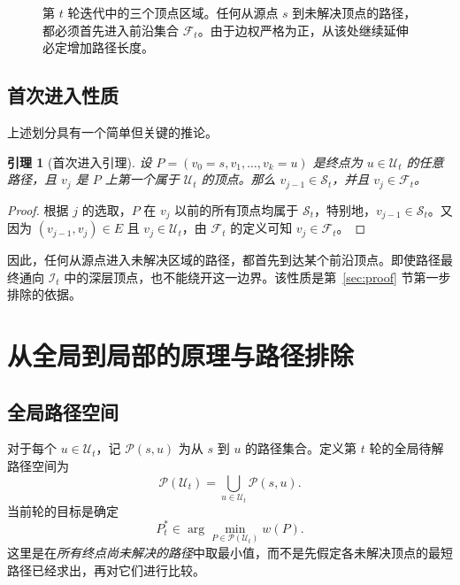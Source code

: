 \documentclass[UTF8,11pt,a4paper]{ctexart}
\newtheorem{lemma}{引理}
\newcommand{\Sset}{\mathcal S_t}
\newcommand{\Uset}{\mathcal U_t}
\newcommand{\Fset}{\mathcal F_t}
\newcommand{\Iset}{\mathcal I_t}
\newcommand{\PathU}{\mathcal P(\mathcal U_t)}
\begin{document}
\begin{figure}[htbp]
\caption{第 $t$ 轮迭代中的三个顶点区域。任何从源点 $s$ 到未解决顶点的路径，都必须首先进入前沿集合 $\mathcal{F}_t$。由于边权严格为正，从该处继续延伸必定增加路径长度。}
\label{fig:spatial}
\end{figure}

\subsection{首次进入性质}
上述划分具有一个简单但关键的推论。

\begin{lemma}[首次进入引理]\label{lem:firstentry}
设 $P=(v_0=s,v_1,\ldots,v_k=u)$ 是终点为 $u\in\Uset$ 的任意路径，且 $v_j$ 是 $P$ 上第一个属于 $\Uset$ 的顶点。那么 $v_{j-1}\in\Sset$，并且 $v_j\in\Fset$。
\end{lemma}
\begin{proof}
根据 $j$ 的选取，$P$ 在 $v_j$ 以前的所有顶点均属于 $\Sset$，特别地，$v_{j-1}\in\Sset$。又因为 $(v_{j-1},v_j)\in E$ 且 $v_j\in\Uset$，由 $\Fset$ 的定义可知 $v_j\in\Fset$。
\end{proof}

因此，任何从源点进入未解决区域的路径，都首先到达某个前沿顶点。即使路径最终通向 $\Iset$ 中的深层顶点，也不能绕开这一边界。该性质是第~\ref{sec:proof} 节第一步排除的依据。

\section{从全局到局部的原理与路径排除}\label{sec:principle}
\subsection{全局路径空间}
对于每个 $u\in\Uset$，记 $\mathcal P(s,u)$ 为从 $s$ 到 $u$ 的路径集合。定义第 $t$ 轮的全局待解路径空间为
\[
  \PathU=\bigcup_{u\in\Uset}\mathcal P(s,u).
\]
当前轮的目标是确定
\[
  P_t^*\in\arg\min_{P\in\PathU}w(P).
\]
这里是在\emph{所有终点尚未解决的路径}中取最小值，而不是先假定各未解决顶点的最短路径已经求出，再对它们进行比较。
\end{document}
